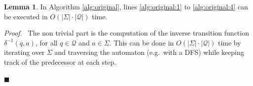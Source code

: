 \documentclass[12pt, a4 paper]{article}
\renewenvironment{proof}[1][Proof]{\begin{mdframed}[backgroundcolor=black!5, topline=false, rightline=false, bottomline=false, linecolor=black!15, linewidth=3pt]{\noindent\textit{#1.}\ }}{\noindent\par\hfill$\blacksquare$\end{mdframed}}
\theoremstyle{definition}
\newtheorem{lemma}{Lemma}
\begin{document}
\bigskip

\begin{lemma}
    In Algorithm \ref{alg:original}, lines \ref{alg:original:1} to \ref{alg:original:4} can be executed in $O(\left| \Sigma \right| \cdot \left| \mathcal{Q} \right|)$ time.
\end{lemma}
\begin{proof}
    The non trivial part is the computation of the inverse transition function $\delta^{-1}(q, a)$, for all $q \in \mathcal{Q}$ and $a \in \Sigma$. This can be done in $O(\left| \Sigma \right| \cdot \left| \mathcal{Q} \right|)$ time by iterating over $\Sigma$ and traversing the automaton (e.g.\ with a DFS) while keeping track of the predecessor at each step.
\end{proof}

\bigskip
\end{document}

